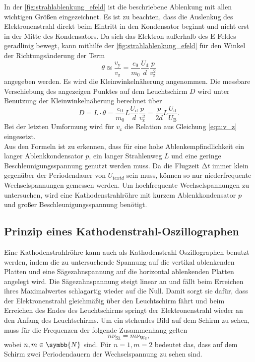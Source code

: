     \noindent In der \autoref{fig:strahlablenkung_efeld} ist die beschriebene Ablenkung mit allen wichtigen Größen eingezeichnet. Es ist zu beachten, dass die Auslenkug
    des Elektronenstrahl direkt beim Eintritt in den Kondensator beginnt und nicht erst in der Mitte des Kondensators. Da sich das Elektron außerhalb des E-Feldes 
    geradlinig bewegt, kann mithilfe der \autoref{fig:strahlablenkung_efeld} für den Winkel der Richtungsänderung der Term 
    \begin{equation*}
        \theta \approxeq \frac{v_{\text{y}}}{v_{\text{z}}} = \frac{e_0}{m_0} \frac{U_{\text{d}}}{d} \frac{p}{v_{\text{z}}^2}
    \end{equation*}
    angegeben werden. Es wird die Kleinwinkelnäherung angenommen. Die messbare Verschiebung des angezeigen Punktes auf dem Leuchtschirm $D$ wird unter Benutzung der Kleinwinkelnäherung
    berechnet über
    \begin{equation}
        \label{eqn:pL_2d}
        D = L \cdot \theta = \frac{e_0}{m_0} L \frac{U_{\text{d}}}{d} \frac{p}{v_{\text{z}}^2} = \frac{p}{2d} L \frac{U_{\text{d}}}{U_{\text{B}}}. 
    \end{equation}
    Bei der letzten Umformung wird für $v_{\text{z}}$ die Relation aus Gleichung \eqref{eqn:v_z} eingesetzt. \\

    \noindent Aus den Formeln ist zu erkennen, dass für eine hohe Ablenkempfindlichkeit ein langer Ablenkkondensator $p$, ein langer Strahlenweg $L$ und eine geringe Beschleunigungsspannung 
    genutzt werden muss. Da die Flugzeit $\increment t$ immer klein gegenüber der Periodendauer von $U_{text{d}}$ sein muss, können so nur niederfrequente Wechselspannungen gemessen
    werden. Um hochfrequente Wechselspannungen zu untersuchen, wird eine Kathodenstrahlröhre mit kurzem Ablenkkondensator $p$ und großer Beschleunigungsspannung benötigt.

\subsection{Prinzip eines Kathodenstrahl-Oszillographen}

    Eine Kathodenstrahlröhre kann auch als Kathodenstrahl-Oszillographen benutzt werden, indem die zu untersuchende Spannung auf die vertikal ablenkenden Platten und eine Sägezahnspannung 
    auf die horizontal ablenkenden Platten angelegt wird. Die Sägezahnspannung steigt linear an und fällt beim Erreichen ihres Maximalwertes schlagartig wieder auf die Null. 
    Damit sorgt sie dafür, dass der Elektronenstrahl gleichmäßig über den Leuchtschirm fährt und beim Erreichen des Endes des Leuchtschirms springt der Elektronenstrahl wieder an
    den Anfang des Leuchtschirms. Um ein stehendes Bild auf dem Schirm zu sehen, muss für die Frequenzen der folgende Zusammenhang gelten
    \begin{equation}\label{eqn:frequenzen}
        n \nu_{\text{Sä}} = m \nu_{\text{We}},
    \end{equation}
    wobei $n,m \in \symbb{N}$ sind. Für $n=1, m=2$ bedeutet das, dass auf dem Schirm zwei Periodendauern der Wechselspannung zu sehen sind.

